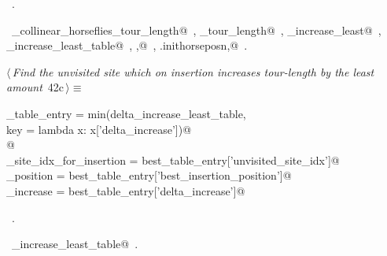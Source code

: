 \documentclass[11.5pt]{report}
\begin{document}
\begin{flushleft}
\begin{list}{}{}
\mbox{}\verb@                                   'best_insertion_position' : ibest, \@\\
\mbox{}\verb@                                   'delta_increase'          : delta_increase_least})@\\
\mbox{}\verb@@{\NWsep}
\end{list}
\vspace{-1.5ex}
\footnotesize
\begin{list}{}{\setlength{\itemsep}{-\parsep}\setlength{\itemindent}{-\leftmargin}}
\item \NWtxtMacroRefIn\ .
\item \NWtxtIdentsUsed\nobreak\  \verb@compute_collinear_horseflies_tour_length@\nobreak\ , \verb@current_tour_length@\nobreak\ , \verb@delta_increase_least@\nobreak\ , \verb@delta_increase_least_table@\nobreak\ , \verb@ibest,@\nobreak\ , \verb@self.inithorseposn,@\nobreak\ .
\item{}
\end{list}
\vspace{4ex}
\end{flushleft}
\vspace{-0.8cm}\newchunk 
\begin{flushleft} \small\label{scrap50}\raggedright\small
{} $\langle\,${\itshape Find the unvisited site which on insertion increases tour-length by the least amount}\nobreak\ {\footnotesize {42c}}$\,\rangle\equiv$
\vspace{-1ex}
\begin{list}{}{} \item
\mbox{}\verb@best_table_entry = min(delta_increase_least_table, \@\\
\mbox{}\verb@                         key = lambda x: x['delta_increase'])@\\
\mbox{}\verb@         @\\
\mbox{}\verb@unvisited_site_idx_for_insertion = best_table_entry['unvisited_site_idx']@\\
\mbox{}\verb@insertion_position               = best_table_entry['best_insertion_position']@\\
\mbox{}\verb@delta_increase                   = best_table_entry['delta_increase']@\\
\mbox{}\verb@@{\NWsep}
\end{list}
\vspace{-1.5ex}
\footnotesize
\begin{list}{}{\setlength{\itemsep}{-\parsep}\setlength{\itemindent}{-\leftmargin}}
\item \NWtxtMacroRefIn\ .
\item \NWtxtIdentsUsed\nobreak\  \verb@delta_increase_least_table@\nobreak\ .
\item{}
\end{list}
\vspace{4ex}
\end{flushleft}
\end{document}
